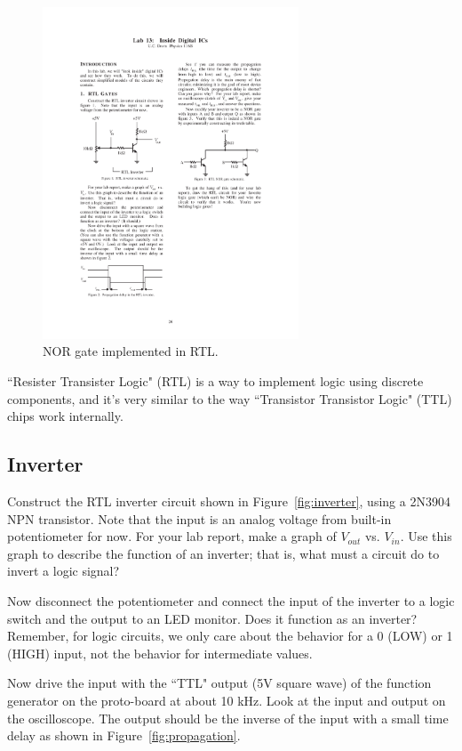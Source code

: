 \documentclass[12pt]{article}
\begin{document}
\begin{figure}[!h]
\centerline{\includegraphics[width=3in]{figs/RTL-NOR.pdf}}
\caption{NOR gate implemented in RTL.}
\label{fig:RTL-NOR}
\end{figure}

``Resister Transister Logic" (RTL) is a way to implement logic using discrete components, and it's very similar to the way
``Transistor Transistor Logic" (TTL) chips work internally.  

\subsection*{Inverter}

Construct the RTL inverter circuit shown in Figure~\ref{fig:inverter}, using a 2N3904 NPN transistor. Note that the input is an analog voltage from built-in  potentiometer for now. For your lab report, make a graph of $V_{out}$ vs. $V_{in}$. Use this graph to describe the function of an inverter; that is, what must a circuit do to invert a logic signal?

Now disconnect the potentiometer and connect the input of the inverter to a logic switch and the output to an LED monitor. Does it function as an inverter?  Remember, for logic circuits, we only care about the behavior for a 0 (LOW) or 1 (HIGH) input, not the behavior for intermediate values.

Now drive the input with the ``TTL"  output (5V square wave) of the function generator on the proto-board at about 10 kHz.  Look at the input and output on the oscilloscope. The output should be the inverse of the input with a small time delay as shown in Figure~\ref{fig:propagation}.  
\end{document}

